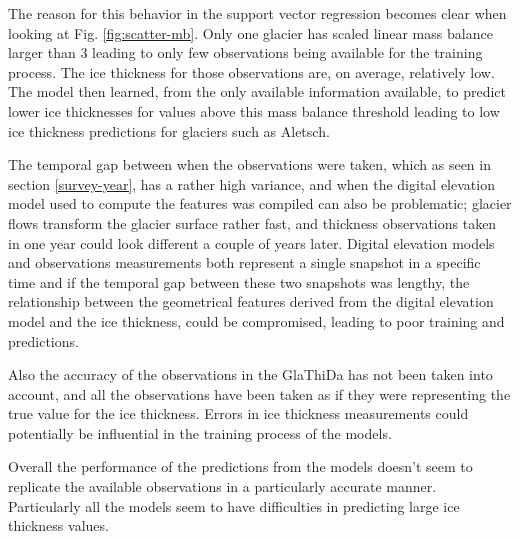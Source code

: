 The reason for this behavior in the support vector regression becomes clear when looking at Fig. \ref{fig:scatter-mb}. Only one glacier has scaled linear mass balance larger than 3 leading to only few observations being available for the training process. The ice thickness for those observations are, on average, relatively low. The model then learned, from the only available information available, to predict lower ice thicknesses for values above this mass balance threshold leading to low ice thickness predictions for glaciers such as Aletsch.

The temporal gap between when the observations were taken, which as seen in section \ref{survey-year}, has a rather high variance, and when the digital elevation model used to compute the features was compiled can also be problematic; glacier flows transform the glacier surface rather fast, and thickness observations taken in one year could look different a couple of years later. Digital elevation models and observations measurements both represent a single snapshot in a specific time and if the temporal gap between these two snapshots was lengthy, the relationship between the geometrical features derived from the digital elevation model and the ice thickness, could be compromised, leading to poor training and predictions.

Also the accuracy of the observations in the GlaThiDa has not been taken into account, and all the observations have been taken as if they were representing the true value for the ice thickness. Errors in ice thickness measurements could potentially be influential in the training process of the models.

Overall the performance of the predictions from the models doesn't seem to replicate the available observations in a particularly accurate manner. Particularly all the models seem to have difficulties in predicting large ice thickness values.


